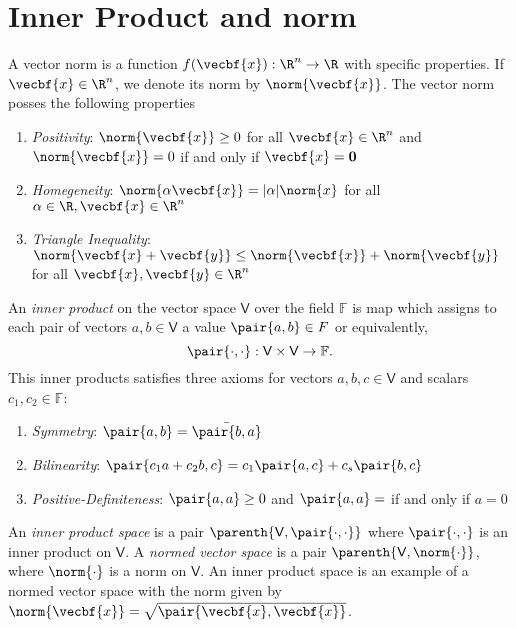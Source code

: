 \documentclass[11pt, reqno]{article}   	%
\newcommand{\F}{\mathbb{F}}
\newcommand{\V}{\mathsf{V}}
\begin{document}
\section{Inner Product and norm}
\begin{definition}
    A vector norm is a function \( f(\vecbf{x}) : \R^n \to \R \) with specific properties.
    If \( \vecbf{x} \in \R^n \), we denote its norm by \( \norm{\vecbf{x}} \).
    The vector norm posses the following properties
    \begin{enumerate}
    	\item \emph{Positivity}: \( \norm{\vecbf{x}} \geq 0 \) for all \( \vecbf{x} \in \R^n \) and \( \norm{\vecbf{x}} = 0 \) if and only if \( \vecbf{x} = \mathbf{0} \)
    	\item \emph{Homegeneity}: \( \norm{\alpha \vecbf{x}} = | \alpha | \norm{x} \) for all \( \alpha \in \R, \vecbf{x} \in \R^n \)
    	\item \emph{Triangle Inequality}: \( \norm{ \vecbf{x} + \vecbf{y}} \leq \norm{\vecbf{x}} + \norm{\vecbf{y}} \) for all \( \vecbf{x},\vecbf{y} \in \R^n \)
    \end{enumerate}
\end{definition}


\begin{definition}
	An \emph{inner product} on the vector space \( \V \) over the field \( \F \) is map which assigns to each pair of vectors \( a, b \in \V\) a value \( \pair{a,b} \in F \) or equivalently,
	\[
		\pair{\cdot,\cdot} : \V \times \V \to \F .
	\]
	This inner products satisfies three axioms for vectors \( a,b,c \in \V \) and scalars \( c_1,c_2 \in \F\):
	\begin{enumerate}
		\item \emph{Symmetry}: \( \pair{a,b} = \bar{\pair{b,a}} \)
		\item \emph{Bilinearity}: \(\pair{c_1 a +c_2 b,c} = c_1 \pair{a,c} + c_s \pair{b,c} \)
		\item \emph{Positive-Definiteness}: \( \pair{a,a} \geq 0 \) and \( \pair{a,a} = \) if and only if \( a = 0 \)
	\end{enumerate}
\end{definition}

An \emph{inner product space} is a pair \( \parenth{\V, \pair{\cdot,\cdot}} \) where \( \pair{\cdot,\cdot} \) is an inner product on \( \V \).
A \emph{normed vector space} is a pair \( \parenth{\V, \norm{\cdot}} \), where \( \norm{\cdot} \) is a norm on \(\V\).
An inner product space is an example of a normed vector space with the norm given by \( \norm{\vecbf{x}} = \sqrt{\pair{\vecbf{x},\vecbf{x}}} \).
\end{document}

